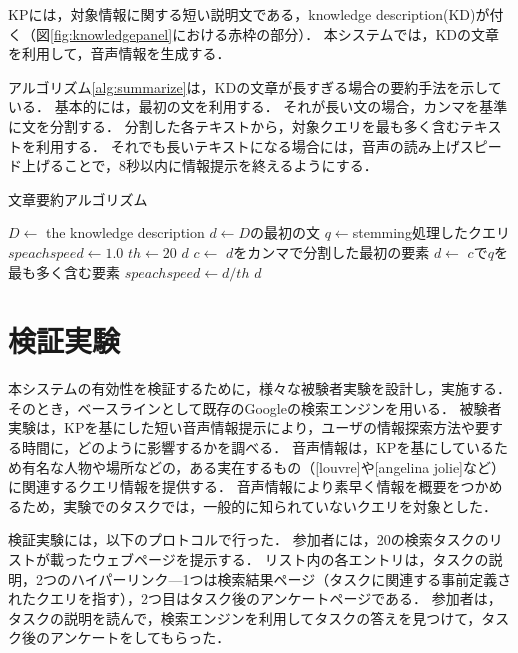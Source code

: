 \documentclass[pdflatex,ja=standard]{bxjsarticle}
\begin{document}
KPには，対象情報に関する短い説明文である，\textrm{knowledge description}(KD)が付く（図\ref{fig:knowledgepanel}における赤枠の部分）．
本システムでは，KDの文章を利用して，音声情報を生成する．

アルゴリズム\ref{alg:summarize}は，KDの文章が長すぎる場合の要約手法を示している．
基本的には，最初の文を利用する．
それが長い文の場合，カンマを基準に文を分割する．
分割した各テキストから，対象クエリを最も多く含むテキストを利用する．
それでも長いテキストになる場合には，音声の読み上げスピード上げることで，8秒以内に情報提示を終えるようにする．

\begin{algorithm}
\caption{文章要約アルゴリズム}
\label{alg:summarize}
\begin{algorithmic}
    \STATE $D \leftarrow$ the knowledge description
    \STATE $d \leftarrow D$の最初の文
    \STATE $q \leftarrow $stemming処理したクエリ
    \STATE $speachspeed \leftarrow 1.0$
    \STATE $th \leftarrow 20$
        \RETURN $d$
    \ELSE
        \STATE $c \leftarrow$ $d$をカンマで分割した最初の要素
        \STATE $d \leftarrow$ $c$で$q$を最も多く含む要素
            \STATE $speachspeed \leftarrow d / th$
        \RETURN $d$
        \ENDIF
    \ENDIF
\end{algorithmic}
\end{algorithm}


\section{検証実験}

本システムの有効性を検証するために，様々な被験者実験を設計し，実施する．
そのとき，ベースラインとして既存のGoogleの検索エンジンを用いる．
被験者実験は，KPを基にした短い音声情報提示により，ユーザの情報探索方法や要する時間に，どのように影響するかを調べる．
音声情報は，KPを基にしているため有名な人物や場所などの，ある実在するもの（[louvre]や[angelina jolie]など）に関連するクエリ情報を提供する．
音声情報により素早く情報を概要をつかめるため，実験でのタスクでは，一般的に知られていないクエリを対象とした．

検証実験には，以下のプロトコルで行った．
参加者には，20の検索タスクのリストが載ったウェブページを提示する．
リスト内の各エントリは，タスクの説明，2つのハイパーリンク---1つは検索結果ページ（タスクに関連する事前定義されたクエリを指す），2つ目はタスク後のアンケートページである．
参加者は，タスクの説明を読んで，検索エンジンを利用してタスクの答えを見つけて，タスク後のアンケートをしてもらった．
\end{document}
